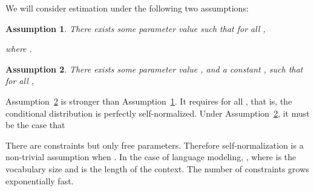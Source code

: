 \documentclass[11pt,a4paper]{article}
\newtheorem{assumption}{Assumption}[section]
\newcommand{\commentout}[1]{}
\begin{document}
\commentout{
\begin{itemize}

\item We have sets  and , where  are
  finite. 

\item There is some unknown joint distribution  where
   and . We assume that the marginal distributions satisfy  for all  and
   for all . 

\item We have training examples 
drawn I.I.D. from .

 \item We have some scoring function  where 
   are the parameters of the model. For example,  may
   be defined by a neural network. 


\item We use  to refer to the parameter space (set of possible
  values of ). We assume that  for some integer .

\item We use  to refer to a distribution from which
negative examples are drawn in the NCE approach. We assume that
 for all .

\end{itemize}}



We will consider estimation under the following two assumptions:

\begin{assumption}
There exists some parameter value  such that for all , 

where .
\label{assump:ranking}
\end{assumption}
\begin{assumption}
There exists some parameter value , and a
constant , such that for all , 

\label{assump:binary}
\end{assumption}

\vspace{-2.5ex}

Assumption~\ref{assump:binary} is stronger than
Assumption~\ref{assump:ranking}. It requires  for all , that is, the conditional distribution is perfectly self-normalized. 
Under Assumption~\ref{assump:binary}, it must be the case that 

There are  constraints but only  free parameters. 
Therefore self-normalization is a non-trivial assumption when .
In the case of language modeling, , where  is the vocabulary size and  is 
the length of the context. The number of constraints grows exponentially fast. 
\commentout{MJC:commented this out for now at least.
Finally we remark that, by taking expectation over  on both sides of the equlity above,  is uniquely determined by : 

}
\end{document}
